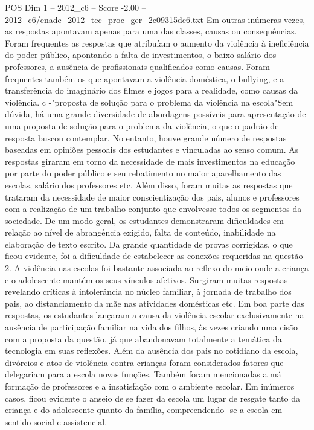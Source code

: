 \begin{textsample}{POS Dim 1 – 2012\_c6 – Score -2.00 – 2012\_c6/enade\_2012\_tec\_proc\_ger\_2c09315dc6.txt}
Em outras inúmeras vezes, as respostas apontavam apenas para uma das classes, causas ou consequências.
Foram frequentes as respostas que atribuíam o aumento da violência à ineficiência do poder público, apontando a falta de investimentos, o baixo salário dos professores, a ausência de profissionais qualificados como causas.
Foram frequentes também os que apontavam a violência doméstica, o bullying, e a transferência do imaginário dos filmes e jogos para a realidade, como causas da violência. c -"proposta de solução para o problema da violência na escola"Sem dúvida, há uma grande diversidade de abordagens possíveis para apresentação de uma proposta de solução para o problema da violência, o que o padrão de resposta buscou contemplar.
No entanto, houve grande número de respostas baseadas em opiniões pessoais dos estudantes e vinculadas ao senso comum.
As respostas giraram em torno da necessidade de mais investimentos na educação por parte do poder público e seu rebatimento no maior aparelhamento das escolas, salário dos professores etc.
Além disso, foram muitas as respostas que trataram da necessidade de maior conscientização dos pais, alunos e professores com a realização de um trabalho conjunto que envolvesse todos os segmentos da sociedade.
De um modo geral, os estudantes demonstraram dificuldades em relação ao nível de abrangência exigido, falta de conteúdo, inabilidade na elaboração de texto escrito.
Da grande quantidade de provas corrigidas, o que ficou evidente, foi a dificuldade de estabelecer as conexões requeridas na questão 2.
A violência nas escolas foi bastante associada ao reflexo do meio onde a criança e o adolescente mantém os seus vínculos afetivos.
Surgiram muitas respostas revelando críticas à intolerância no núcleo familiar, à jornada de trabalho dos pais, ao distanciamento da mãe nas atividades domésticas etc.
Em boa parte das respostas, os estudantes lançaram a causa da violência escolar exclusivamente na ausência de participação familiar na vida dos filhos, às vezes criando uma cisão com a proposta da questão, já que abandonavam totalmente a temática da tecnologia em suas reflexões.
Além da ausência dos pais no cotidiano da escola, divórcios e atos de violência contra crianças foram considerados fatores que delegariam para a escola novas funções.
Também foram mencionadas a má formação de professores e a insatisfação com o ambiente escolar.
Em inúmeros casos, ficou evidente o anseio de se fazer da escola um lugar de resgate tanto da criança e do adolescente quanto da família, compreendendo -se a escola em sentido social e assistencial.

\end{textsample}
